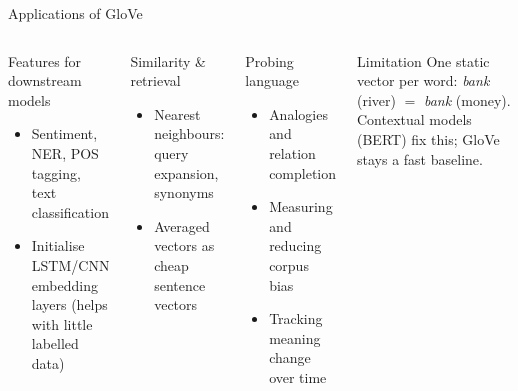 \documentclass[aspectratio=169,11pt]{beamer}
\begin{document}
\begin{frame}{Applications of GloVe}
\small\vspace{-2mm}
\begin{columns}[T]
\begin{block}{Features for downstream models}
\begin{itemize}
  \item Sentiment, NER, POS tagging, text classification
  \item Initialise LSTM/CNN embedding layers (helps with little labelled data)
\end{itemize}
\end{block}
\begin{block}{Similarity \& retrieval}
\begin{itemize}
  \item Nearest neighbours: query expansion, synonyms
  \item Averaged vectors as cheap sentence vectors
\end{itemize}
\end{block}
\begin{block}{Probing language}
\begin{itemize}
  \item Analogies and relation completion
  \item Measuring and reducing corpus bias
  \item Tracking meaning change over time
\end{itemize}
\end{block}
\vspace{-1mm}
\begin{alertblock}{Limitation}
One static vector per word: \emph{bank} (river) $=$ \emph{bank} (money).
Contextual models (BERT) fix this; GloVe stays a fast baseline.
\end{alertblock}
\end{columns}
\end{frame}
\end{document}
